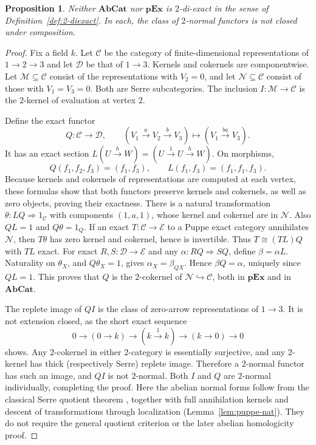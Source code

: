 \documentclass[11pt,reqno,a4paper]{amsart}
\newtheorem{proposition}[theorem]{Proposition}
\theoremstyle{definition}
\theoremstyle{remark}
\newcommand{\C}{\mathcal{C}}
\newcommand{\D}{\mathcal{D}}
\newcommand{\E}{\mathcal{E}}
\newcommand{\M}{\mathcal{M}}
\newcommand{\N}{\mathcal{N}}
\newcommand{\0}{\mathbf{0}}
\renewcommand{\1}{\mathbf{1}}
\newcommand{\AbCat}{\mathbf{AbCat}}
\newcommand{\pExact}{\mathbf{pEx}}
\begin{document}
\begin{proposition}\label{prop:abelian-not-diexact}
Neither $\AbCat$ nor $\pExact$ is $2$-di-exact in the sense of
Definition~\ref{def:2-diexact}. In each, the class of $2$-normal
functors is not closed under composition.
\end{proposition}
\begin{proof}
Fix a field $k$. Let $\C$ be the category of finite-dimensional
representations of $1\to2\to3$ and let $\D$ be that of $1\to3$.
Kernels and cokernels are componentwise. Let $\M\subseteq\C$
consist of the representations with $V_2=0$, and let
$\N\subseteq\C$ consist of those with $V_1=V_3=0$. Both are
Serre subcategories. The inclusion $I:\M\to\C$ is the $2$-kernel
of evaluation at vertex $2$.

Define the exact functor
\[
 Q:\C\longrightarrow\D,\qquad
 (V_1\xrightarrow aV_2\xrightarrow bV_3)
 \longmapsto(V_1\xrightarrow{ba}V_3).
\]
It has an exact section
$L(U\xrightarrow hW)=(U\xrightarrow1U\xrightarrow hW)$.
On morphisms,
\[
 Q(f_1,f_2,f_3)=(f_1,f_3),\qquad
 L(f_1,f_3)=(f_1,f_1,f_3).
\]
Because kernels and cokernels of representations are computed
at each vertex, these formulas show that both functors preserve
kernels and cokernels, as well as zero objects, proving their
exactness.
There is a natural transformation $\theta:LQ\Rightarrow1_{\C}$
with components $(1,a,1)$, whose kernel and cokernel are in $\N$.
Also $QL=1$ and $Q\theta=1_Q$.
If an exact $T:\C\to\E$ to a Puppe exact category annihilates
$\N$, then $T\theta$ has zero kernel and cokernel, hence is
invertible. Thus $T\cong(TL)Q$ with $TL$ exact. For exact
$R,S:\D\to\E$ and any $\alpha:RQ\Rightarrow SQ$, define
$\beta=\alpha L$. Naturality on $\theta_X$, and $Q\theta_X=1$,
gives $\alpha_X=\beta_{QX}$. Hence $\beta Q=\alpha$, uniquely
since $QL=1$. This proves that $Q$ is the $2$-cokernel of
$\N\hookrightarrow\C$, both in $\pExact$ and in $\AbCat$.

The replete image of $QI$ is the class of zero-arrow representations
of $1\to3$. It is not extension closed, as the short exact sequence
\[
 0\longrightarrow(0\to k)\longrightarrow
 (k\xrightarrow1 k)\longrightarrow(k\to0)\longrightarrow0
\]
shows. Any $2$-cokernel in either $2$-category is essentially
surjective, and any $2$-kernel has thick (respectively Serre)
replete image. Therefore a $2$-normal functor has such an image,
and $QI$ is not $2$-normal. Both $I$ and $Q$ are $2$-normal
individually, completing the proof. Here the abelian normal forms
follow from the classical Serre quotient theorem
\cite{Gabriel,StacksSerreQuotient}, together with full annihilation
kernels and descent of transformations through localization
(Lemma~\ref{lem:puppe-nat}). They do not require the general quotient
criterion or the later abelian homologicity proof.
\end{proof}
\end{document}
